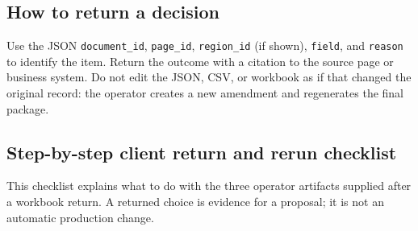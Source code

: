 \documentclass[
]{article}
\begin{document}
\subsection{How to return a decision}\label{how-to-return-a-decision}

Use the JSON \texttt{document\_\allowbreak{}id},
\texttt{page\_\allowbreak{}id}, \texttt{region\_\allowbreak{}id} (if
shown), \texttt{field}, and \texttt{reason} to identify the item. Return
the outcome with a citation to the source page or business system. Do
not edit the JSON, CSV, or workbook as if that changed the original
record: the operator creates a new amendment and regenerates the final
package.

\subsection{Step-by-step client return and rerun
checklist}\label{step-by-step-client-return-and-rerun-checklist}

This checklist explains what to do with the three operator artifacts
supplied after a workbook return. A returned choice is evidence for a
proposal; it is not an automatic production change.
\end{document}
